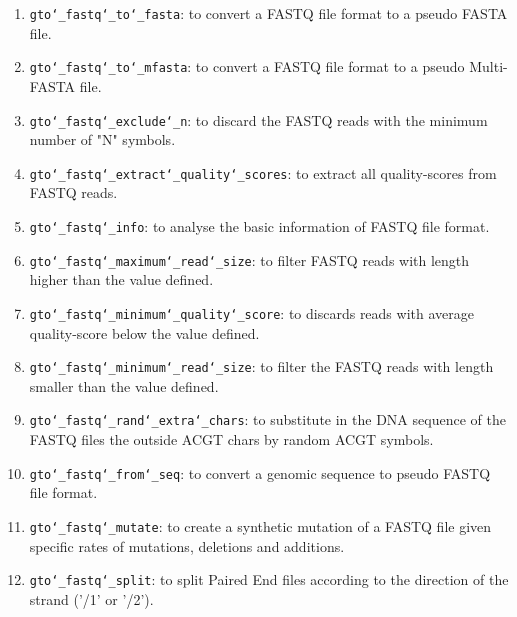 \begin{enumerate}

\item \texttt{gto\char`_fastq\char`_to\char`_fasta}: to convert a FASTQ file format to a pseudo FASTA file.

\item \texttt{gto\char`_fastq\char`_to\char`_mfasta}: to convert a FASTQ file format to a pseudo Multi-FASTA file.

\item \texttt{gto\char`_fastq\char`_exclude\char`_n}: to discard the FASTQ reads with the minimum number of "N" symbols.

\item \texttt{gto\char`_fastq\char`_extract\char`_quality\char`_scores}: to extract all quality-scores from FASTQ reads.

\item \texttt{gto\char`_fastq\char`_info}: to analyse the basic information of FASTQ file format.

\item \texttt{gto\char`_fastq\char`_maximum\char`_read\char`_size}: to filter FASTQ reads with length higher than the value defined.

\item \texttt{gto\char`_fastq\char`_minimum\char`_quality\char`_score}: to discards reads with average quality-score below the value defined.

\item \texttt{gto\char`_fastq\char`_minimum\char`_read\char`_size}: to filter the FASTQ reads with length smaller than the value defined.

\item \texttt{gto\char`_fastq\char`_rand\char`_extra\char`_chars}: to substitute in the DNA sequence of the FASTQ files the outside ACGT chars by random ACGT symbols.

\item \texttt{gto\char`_fastq\char`_from\char`_seq}: to convert a genomic sequence to pseudo FASTQ file format.

\item \texttt{gto\char`_fastq\char`_mutate}: to create a synthetic mutation of a FASTQ file given specific rates of mutations, deletions and additions.

\item \texttt{gto\char`_fastq\char`_split}: to split Paired End files according to the direction of the strand ('/1' or '/2').


\end{enumerate}
